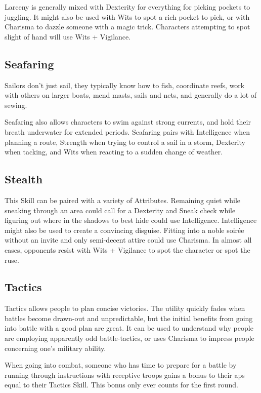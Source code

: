 \begin{multicols}{2}
Larceny is generally mixed with Dexterity for everything for picking pockets to juggling.
It might also be used with Wits to spot a rich pocket to pick, or with Charisma to dazzle someone with a magic trick.
Characters attempting to spot slight of hand will use Wits + Vigilance.

\subsection{Seafaring}

Sailors don't just sail, they typically know how to fish, coordinate reefs, work with others on larger boats, mend masts, sails and nets, and generally do a lot of sewing.

Seafaring also allows characters to swim against strong currents, and hold their breath underwater for extended periods.
Seafaring pairs with Intelligence when planning a route, Strength when trying to control a sail in a storm, Dexterity when tacking, and Wits when reacting to a sudden change of weather.

\subsection{Stealth}

This Skill can be paired with a variety of Attributes.
Remaining quiet while sneaking through an area could call for a Dexterity and Sneak check while figuring out where in the shadows to best hide could use Intelligence.
Intelligence might also be used to create a convincing disguise.
Fitting into a noble soir\'{e}e without an invite and only semi-decent attire could use Charisma.
In almost all cases, opponents resist with Wits + Vigilance to spot the character or spot the ruse.

\subsection{Tactics}

Tactics allows people to plan concise victories.
The utility quickly fades when battles become drawn-out and unpredictable, but the initial benefits from going into battle with a good plan are great.
It can be used to understand why people are employing apparently odd battle-tactics, or uses Charisma to impress people concerning one's military ability.

When going into combat, someone who has time to prepare for a battle by running through instructions with receptive troops gains a bonus to their \glspl{ap} equal to their Tactics Skill.
This bonus only ever counts for the first \gls{round}.


\end{multicols}
